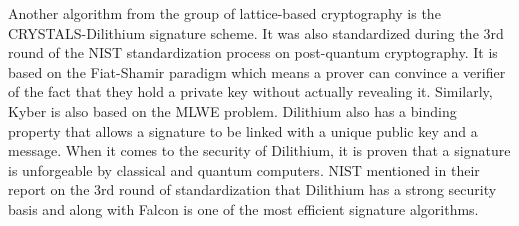 Another algorithm from the group of lattice-based cryptography is the CRYSTALS-Dilithium signature scheme. It was also standardized during the 3rd round of the NIST standardization process on post-quantum cryptography. It is based on the Fiat-Shamir paradigm which means a prover can convince a verifier of the fact that they hold a private key without actually revealing it. Similarly, Kyber is also based on the MLWE problem. Dilithium also has a binding property that allows a signature to be linked with a unique public key and a message. When it comes to the security of Dilithium, it is proven that a signature is unforgeable by classical and quantum computers. NIST mentioned in their report on the 3rd round of standardization that Dilithium has a strong security basis and along with Falcon is one of the most efficient signature algorithms. \cite{Alagic2022}
